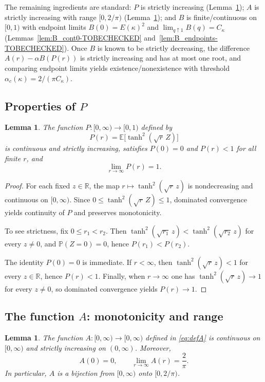 \documentclass[11pt]{article}
\newtheorem{lemma}[theorem]{Lemma}
\begin{document}
The remaining ingredients are standard: $P$ is strictly increasing (Lemma~\ref{lem:P_properties-TOBECHECKED}); $A$ is strictly increasing with range $[0,2/\pi)$ (Lemma~\ref{lem:A-TOBECHECKED}); and $B$ is finite/continuous on $[0,1)$ with endpoint limits $B(0)=E(\kappa)^2$ and $\lim_{q\uparrow 1}B(q)=C_\kappa$ (Lemmas~\ref{lem:B_cont0-TOBECHECKED} and~\ref{lem:B_endpoints-TOBECHECKED}). Once $B$ is known to be strictly decreasing, the difference $A(r)-\alpha B(P(r))$ is strictly increasing and has at most one root, and comparing endpoint limits yields existence/nonexistence with threshold $\alpha_c(\kappa)=2/(\pi C_\kappa)$.

\subsection{Properties of $P$}
\begin{lemma}\label{lem:P_properties-TOBECHECKED}
The function $P:[0,\infty)\to[0,1)$ defined by
\[
P(r)=\mathbb E\big[\tanh^2(\sqrt r\,Z)\big]
\]
is continuous and strictly increasing, satisfies $P(0)=0$ and $P(r)<1$ for all finite $r$, and
\[
\lim_{r\to\infty}P(r)=1.
\]
\end{lemma}
\begin{proof}
For each fixed $z\in\mathbb R$, the map $r\mapsto \tanh^2(\sqrt r\,z)$ is nondecreasing and continuous on $[0,\infty)$. Since $0\le \tanh^2(\sqrt r\,Z)\le 1$, dominated convergence yields continuity of $P$ and preserves monotonicity.

To see strictness, fix $0\le r_1<r_2$. Then $\tanh^2(\sqrt{r_1}\,z)<\tanh^2(\sqrt{r_2}\,z)$ for every $z\neq 0$, and $\mathbb{P}(Z=0)=0$, hence $P(r_1)<P(r_2)$.

The identity $P(0)=0$ is immediate. If $r<\infty$, then $\tanh^2(\sqrt r\,z)<1$ for every $z\in\mathbb R$, hence $P(r)<1$. Finally, when $r\to\infty$ one has $\tanh^2(\sqrt r\,z)\to 1$ for every $z\ne 0$, so dominated convergence yields $P(r)\to 1$.
\end{proof}

\subsection{The function $A$: monotonicity and range}
\begin{lemma}\label{lem:A-TOBECHECKED}
The function $A:[0,\infty)\to[0,\infty)$ defined in \eqref{eq:defA} is continuous on $[0,\infty)$ and strictly increasing on $(0,\infty)$. Moreover,
\[
A(0)=0,
\qquad
\lim_{r\to\infty}A(r)=\frac{2}{\pi}.
\]
In particular, $A$ is a bijection from $[0,\infty)$ onto $[0,2/\pi)$.
\end{lemma}
\end{document}
